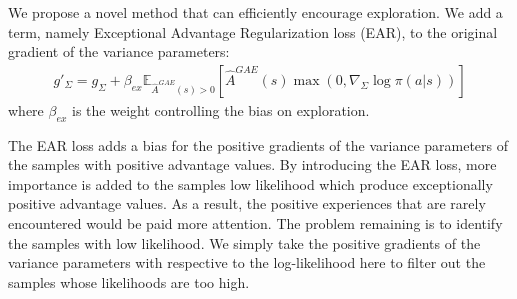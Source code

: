 We propose a novel method that can efficiently encourage exploration. We add a term, namely Exceptional Advantage Regularization loss (EAR), to the original gradient of the variance parameters:
\begin{align}
g'_\Sigma = g_\Sigma + \beta_{ex} \mathbb{E}_{\hat{A}^{GAE}(s) > 0} \left[
\hat{A}^{GAE}(s) 
\max\left(0,\nabla_\Sigma \log \pi (a|s)\right)\right]
\end{align}
where $\beta_{ex} $ is the weight controlling the bias on exploration.

The EAR loss adds a bias for the positive gradients of the variance parameters of the samples with positive advantage values. By introducing the EAR loss, more importance is added to the samples low likelihood which produce exceptionally positive advantage values. As a result, the positive experiences that are rarely encountered would be paid more attention. The problem remaining is to identify the samples with low likelihood. We simply take the positive gradients of the variance parameters with respective to the log-likelihood here to filter out the samples whose likelihoods are too high.
